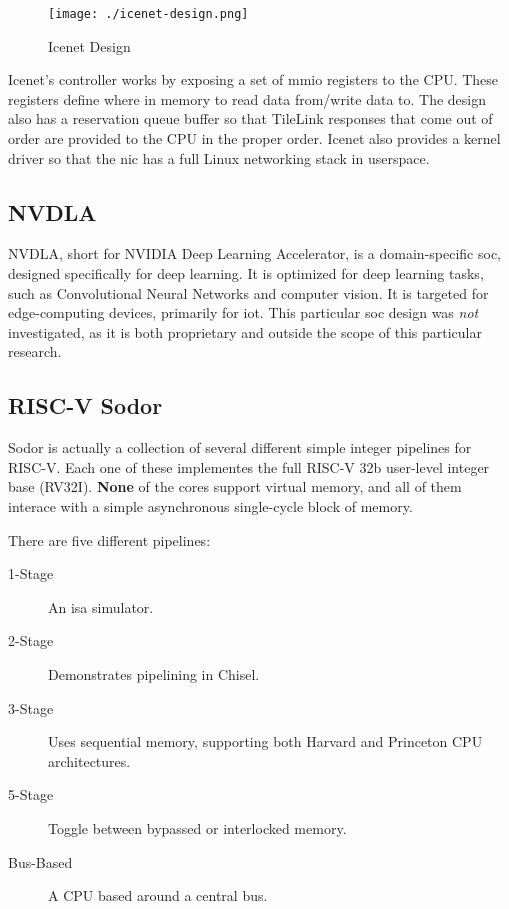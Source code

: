 \begin{figure}[h!tbp]
  \centering
  \texttt{[image: ./icenet-design.png]}
  \caption{Icenet Design}
  \label{fig:Icenet_Generator}
\end{figure}

Icenet's controller works by exposing a set of \gls{mmio} registers to the CPU.\@
These registers define where in memory to read data from/write data to.
The design also has a reservation queue buffer so that TileLink responses that come out of order are provided to the CPU in the proper order.
Icenet also provides a kernel driver so that the \gls{nic} has a full Linux networking stack in userspace.

\subsection{NVDLA}\label{sec:NVDLA_Generator}
\nocite{nvdlaPaper}
\nocite{nvdlaNVIDIAPresentation}
NVDLA, short for NVIDIA Deep Learning Accelerator, is a domain-specific \gls{soc}, designed specifically for deep learning.
It is optimized for deep learning tasks, such as Convolutional Neural Networks and computer vision.
It is targeted for edge-computing devices, primarily for \Gls{iot}.
This particular \gls{soc} design was \emph{not} investigated, as it is both proprietary and outside the scope of this particular research.

\subsection{RISC-V Sodor}\label{sec:RISC-V_Sodor}
\nocite{sodorGithub}
Sodor is actually a collection of several different simple integer pipelines for RISC-V.
Each one of these implementes the full RISC-V 32b user-level integer base (RV32I).
\textbf{None} of the cores support virtual memory, and all of them interace with a simple asynchronous single-cycle block of memory.

There are five different pipelines:
\begin{description}
\item[1-Stage] An \gls{isa} simulator.
\item[2-Stage] Demonstrates pipelining in Chisel.
\item[3-Stage] Uses sequential memory, supporting both Harvard and Princeton CPU architectures.
\item[5-Stage] Toggle between bypassed or interlocked memory.
\item[Bus-Based] A CPU based around a central bus.
\end{description}

